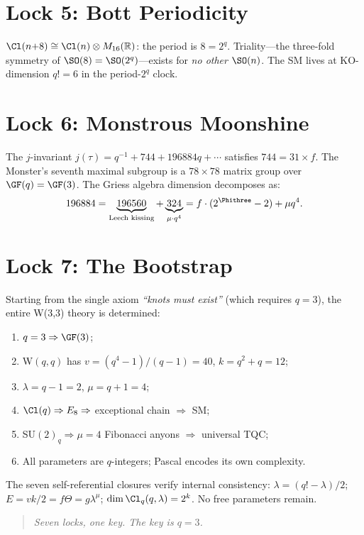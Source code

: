 \section{Lock 5: Bott Periodicity}

$\Cl(n{+}8)\cong \Cl(n)\otimes M_{16}(\mathbb{R})$:
the period is $8 = 2^q$. Triality---the three-fold symmetry of
$\SO(8)=\SO(2^q)$---exists for \emph{no other} $\SO(n)$.
The SM lives at KO-dimension $q!=6$ in the period-$2^q$ clock.


\section{Lock 6: Monstrous Moonshine}

The $j$-invariant $j(\tau)=q^{-1}+744+196884q+\cdots$ satisfies
$744 = 31\times f$. The Monster's seventh maximal subgroup is a
$78\times 78$ matrix group over $\GF(q)=\GF(3)$.
The Griess algebra dimension decomposes as:
\begin{equation}
196884 = \underbrace{196560}_{\text{Leech kissing}} + \underbrace{324}_{\mu\cdot q^4}
= f\cdot(2^{\Phithree}-2) + \mu q^4.
\end{equation}


\section{Lock 7: The Bootstrap}

Starting from the single axiom \emph{``knots must exist''}
(which requires $q=3$), the entire W(3,3) theory is determined:
\begin{enumerate}[nosep]
\item $q=3 \Rightarrow \GF(3)$;
\item W$(q,q)$ has $v=(q^4{-}1)/(q{-}1)=40$, $k=q^2{+}q=12$;
\item $\lambda=q{-}1=2$, $\mu=q{+}1=4$;
\item $\Cl(q) \Rightarrow E_8 \Rightarrow$ exceptional chain $\Rightarrow$ SM;
\item SU$(2)_q \Rightarrow \mu=4$ Fibonacci anyons $\Rightarrow$ universal TQC;
\item All parameters are $q$-integers; Pascal encodes its own complexity.
\end{enumerate}

The seven self-referential closures verify internal consistency:
$\lambda = (q!{-}\lambda)/2$; $E = vk/2 = f\Theta = g\lambda^\mu$;
$\dim\Cl_q(q,\lambda)=2^k$. No free parameters remain.

\begin{quote}
\emph{Seven locks, one key. The key is $q=3$.}
\end{quote}
